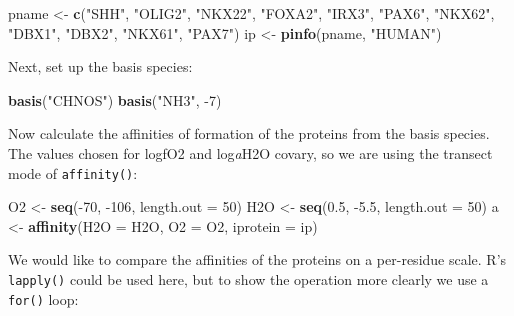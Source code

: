 \documentclass[]{tufte-book}
\newenvironment{Shaded}{}{}
\newcommand{\KeywordTok}[1]{\textcolor[rgb]{0.00,0.44,0.13}{\textbf{#1}}}
\newcommand{\DataTypeTok}[1]{\textcolor[rgb]{0.56,0.13,0.00}{#1}}
\newcommand{\DecValTok}[1]{\textcolor[rgb]{0.25,0.63,0.44}{#1}}
\newcommand{\FloatTok}[1]{\textcolor[rgb]{0.25,0.63,0.44}{#1}}
\newcommand{\StringTok}[1]{\textcolor[rgb]{0.25,0.44,0.63}{#1}}
\newcommand{\OperatorTok}[1]{\textcolor[rgb]{0.40,0.40,0.40}{#1}}
\newcommand{\NormalTok}[1]{#1}
\begin{document}
\begin{Shaded}
\begin{Highlighting}[]
\NormalTok{pname <-}\StringTok{ }\KeywordTok{c}\NormalTok{(}\StringTok{"SHH"}\NormalTok{, }\StringTok{"OLIG2"}\NormalTok{, }\StringTok{"NKX22"}\NormalTok{, }\StringTok{"FOXA2"}\NormalTok{, }\StringTok{"IRX3"}\NormalTok{,}
  \StringTok{"PAX6"}\NormalTok{, }\StringTok{"NKX62"}\NormalTok{, }\StringTok{"DBX1"}\NormalTok{, }\StringTok{"DBX2"}\NormalTok{, }\StringTok{"NKX61"}\NormalTok{, }\StringTok{"PAX7"}\NormalTok{)}
\NormalTok{ip <-}\StringTok{ }\KeywordTok{pinfo}\NormalTok{(pname, }\StringTok{"HUMAN"}\NormalTok{)}
\end{Highlighting}
\end{Shaded}

Next, set up the basis species:

\begin{Shaded}
\begin{Highlighting}[]
\KeywordTok{basis}\NormalTok{(}\StringTok{"CHNOS"}\NormalTok{)}
\KeywordTok{basis}\NormalTok{(}\StringTok{"NH3"}\NormalTok{, }\OperatorTok{-}\DecValTok{7}\NormalTok{)}
\end{Highlighting}
\end{Shaded}

Now calculate the affinities of formation of the proteins from the basis
species. The values chosen for logfO2 and log\emph{a}H2O covary, so we
are using the transect mode of {\texttt{affinity()}}:

\begin{Shaded}
\begin{Highlighting}[]
\NormalTok{O2 <-}\StringTok{ }\KeywordTok{seq}\NormalTok{(}\OperatorTok{-}\DecValTok{70}\NormalTok{, }\OperatorTok{-}\DecValTok{106}\NormalTok{, }\DataTypeTok{length.out =} \DecValTok{50}\NormalTok{)}
\NormalTok{H2O <-}\StringTok{ }\KeywordTok{seq}\NormalTok{(}\FloatTok{0.5}\NormalTok{, }\OperatorTok{-}\FloatTok{5.5}\NormalTok{, }\DataTypeTok{length.out =} \DecValTok{50}\NormalTok{)}
\NormalTok{a <-}\StringTok{ }\KeywordTok{affinity}\NormalTok{(}\DataTypeTok{H2O =}\NormalTok{ H2O, }\DataTypeTok{O2 =}\NormalTok{ O2, }\DataTypeTok{iprotein =}\NormalTok{ ip)}
\end{Highlighting}
\end{Shaded}

We would like to compare the affinities of the proteins on a per-residue
scale. R's \texttt{lapply()} could be used here, but to show the
operation more clearly we use a \texttt{for()} loop:
\end{document}
